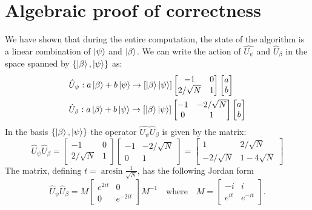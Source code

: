 \section{Algebraic proof of correctness}
We have shown that during the entire computation, the state of the algorithm is a linear combination of $\ket{\psi}$ and $\ket{\beta}$. We can write the action of $\hat{U_\psi}$ and $\hat{U}_\beta$ in the space spanned by $\{\ket{\beta}, \ket{\psi}\}$ as:
\begin{align*}
    &\hat{U}_\psi : a\ket{\beta} + b\ket{\psi} \rightarrow [\ket{\beta}\ket{\psi}] \begin{bmatrix}
    -1 & 0 \\
    2/\sqrt{N} & 1
    \end{bmatrix} 
    \begin{bmatrix}
    a \\
    b
    \end{bmatrix} \\
    &\hat{U}_\beta : a\ket{\beta} + b\ket{\psi} \rightarrow [\ket{\beta}\ket{\psi}] \begin{bmatrix}
    -1 & -2/\sqrt{N} \\
    0 & 1
    \end{bmatrix} 
    \begin{bmatrix}
    a \\
    b
    \end{bmatrix} 
\end{align*}
In the basis $\{\ket{\beta}, \ket{\psi}\}$ the operator $\hat{U_\psi}\hat{U}_\beta$ is given by the matrix:
\begin{equation*}
    \hat{U}_\psi\hat{U}_\beta = \begin{bmatrix}
    -1 & 0 \\
    2/\sqrt{N} & 1
    \end{bmatrix} 
    \begin{bmatrix}
    -1 & -2/\sqrt{N} \\
    0 & 1
    \end{bmatrix}  =
    \begin{bmatrix}
    1 & 2/\sqrt{N} \\
    -2/\sqrt{N} & 1-4\sqrt{N}
    \end{bmatrix} 
\end{equation*}
The matrix, defining $t=\arcsin{\frac{1}{\sqrt{N}}}$, has the following Jordan form
\begin{equation*}
    \hat{U}_\psi\hat{U}_\beta = M  \begin{bmatrix}
    e^{2it} & 0 \\
    0 & e^{-2it}
    \end{bmatrix}  M^{-1} \quad \text{where} \quad M = \begin{bmatrix}
    -i & i \\
    e^{it} & e^{-it}
    \end{bmatrix}.
  \end{equation*}
